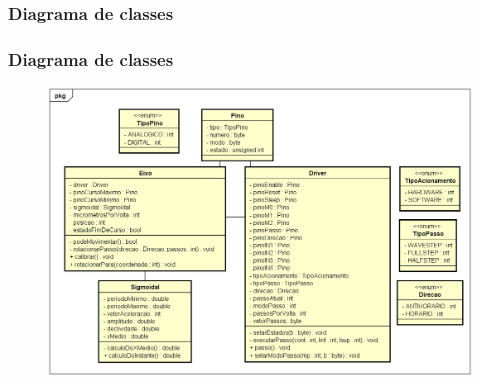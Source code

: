 \subsubsection{Diagrama de classes}

\begin{frame}
\frametitle{Diagrama de classes}

\begin{figure}
\centering
\includegraphics[scale = 0.35]{figs/diagramaclasses}
\end{figure}

\end{frame}
